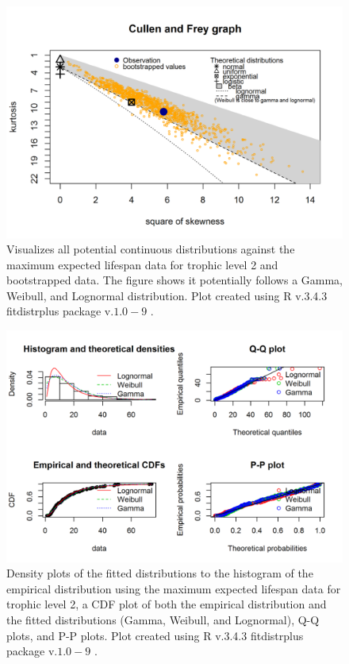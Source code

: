 \documentclass[oneside,12pt,final]{sty/ucthesis-CA2012}
\let\cite\citep                             %
\begin{document}
\begin{mainmatter}
\begin{figure}[H]
     \centering
       \includegraphics[width=.8\textwidth]{fig/cullen_frey_l2}
    \caption{Visualizes all potential continuous distributions against the maximum expected lifespan data for trophic level 2 and bootstrapped data. The figure shows it potentially follows a Gamma, Weibull, and Lognormal distribution. Plot created using R v.3.4.3 \cite{Rcite} fitdistrplus package v.$1.0-9$ \cite{fitdistrplus}. }
    \label{cf_l2}
\end{figure}

\begin{figure}[H]
     \centering
       \includegraphics[width=.8\textwidth]{fig/gof_l2}
    \caption{Density plots of the fitted distributions to the histogram of the empirical distribution using the maximum expected lifespan data for trophic level 2, a CDF plot of both the empirical distribution and the fitted distributions (Gamma, Weibull, and Lognormal), Q-Q plots, and P-P plots. Plot created using R v.3.4.3 \cite{Rcite} fitdistrplus package v.$1.0-9$ \cite{fitdistrplus}. }
    \label{gof_l2}
\end{figure}


\end{mainmatter}
\end{document}
